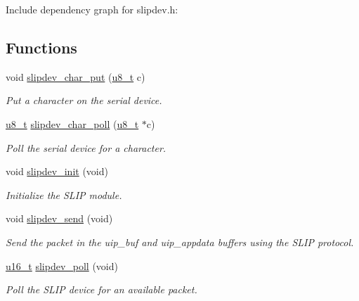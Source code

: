 Include dependency graph for slipdev.h:\subsection*{Functions}
\begin{CompactItemize}
\item 
void \hyperlink{a00068_gd78a209e9faa8a97702424b44134ced3}{slipdev\_\-char\_\-put} (\hyperlink{a00070_ge081489b4906f65a3cb18e9fbe9f8d23}{u8\_\-t} c)
\begin{CompactList}\small\item\em Put a character on the serial device. \item\end{CompactList}\item 
\hyperlink{a00070_ge081489b4906f65a3cb18e9fbe9f8d23}{u8\_\-t} \hyperlink{a00068_g4e8cf1d2e3d874b7aa681a272d957ccb}{slipdev\_\-char\_\-poll} (\hyperlink{a00070_ge081489b4906f65a3cb18e9fbe9f8d23}{u8\_\-t} $\ast$c)
\begin{CompactList}\small\item\em Poll the serial device for a character. \item\end{CompactList}\item 
void \hyperlink{a00068_g24cdb292a83c88750cdc170546038d0d}{slipdev\_\-init} (void)
\begin{CompactList}\small\item\em Initialize the SLIP module. \item\end{CompactList}\item 
void \hyperlink{a00068_gf8c1cf09a7c592ed1ea6b8595aa5f162}{slipdev\_\-send} (void)
\begin{CompactList}\small\item\em Send the packet in the uip\_\-buf and uip\_\-appdata buffers using the SLIP protocol. \item\end{CompactList}\item 
\hyperlink{a00070_gfc6499c1f28697aa3bfc2804d496fd11}{u16\_\-t} \hyperlink{a00068_g0fba24e31e1974adfdae516ddadb5ee2}{slipdev\_\-poll} (void)
\begin{CompactList}\small\item\em Poll the SLIP device for an available packet. \item\end{CompactList}\end{CompactItemize}
